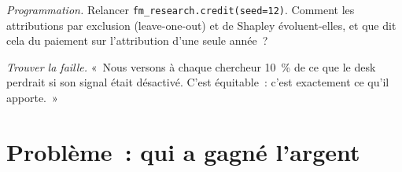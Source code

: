 \begin{exercise}[$\star\star\star$]\label{exo:fm:managing-researchers-traders-and-engineers:7}
\emph{Programmation.} Relancer \texttt{fm\_research.credit(seed=12)}. Comment les attributions par exclusion (leave-one-out) et de Shapley évoluent-elles, et que dit cela du
paiement sur l'attribution d'une seule année~?
\end{exercise}

\begin{exercise}[$\star\star\star$]\label{exo:fm:managing-researchers-traders-and-engineers:8}
\emph{Trouver la faille.} «~Nous versons à chaque chercheur 10~\% de ce que le desk perdrait si son signal était désactivé. C'est équitable~: c'est exactement
ce qu'il apporte.~»
\end{exercise}

\section{Problème~: qui a gagné l'argent}

